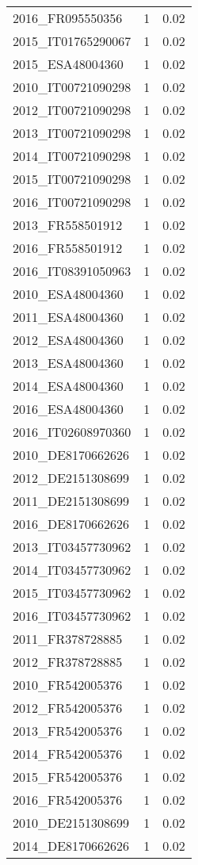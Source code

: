 \begin{table*}[htbp]
\begin{tabular}{lrr}
2016_FR095550356 & 1 & 0.02 \\
2015_IT01765290067 & 1 & 0.02 \\
2015_ESA48004360 & 1 & 0.02 \\
2010_IT00721090298 & 1 & 0.02 \\
2012_IT00721090298 & 1 & 0.02 \\
2013_IT00721090298 & 1 & 0.02 \\
2014_IT00721090298 & 1 & 0.02 \\
2015_IT00721090298 & 1 & 0.02 \\
2016_IT00721090298 & 1 & 0.02 \\
2013_FR558501912 & 1 & 0.02 \\
2016_FR558501912 & 1 & 0.02 \\
2016_IT08391050963 & 1 & 0.02 \\
2010_ESA48004360 & 1 & 0.02 \\
2011_ESA48004360 & 1 & 0.02 \\
2012_ESA48004360 & 1 & 0.02 \\
2013_ESA48004360 & 1 & 0.02 \\
2014_ESA48004360 & 1 & 0.02 \\
2016_ESA48004360 & 1 & 0.02 \\
2016_IT02608970360 & 1 & 0.02 \\
2010_DE8170662626 & 1 & 0.02 \\
2012_DE2151308699 & 1 & 0.02 \\
2011_DE2151308699 & 1 & 0.02 \\
2016_DE8170662626 & 1 & 0.02 \\
2013_IT03457730962 & 1 & 0.02 \\
2014_IT03457730962 & 1 & 0.02 \\
2015_IT03457730962 & 1 & 0.02 \\
2016_IT03457730962 & 1 & 0.02 \\
2011_FR378728885 & 1 & 0.02 \\
2012_FR378728885 & 1 & 0.02 \\
2010_FR542005376 & 1 & 0.02 \\
2012_FR542005376 & 1 & 0.02 \\
2013_FR542005376 & 1 & 0.02 \\
2014_FR542005376 & 1 & 0.02 \\
2015_FR542005376 & 1 & 0.02 \\
2016_FR542005376 & 1 & 0.02 \\
2010_DE2151308699 & 1 & 0.02 \\
2014_DE8170662626 & 1 & 0.02 \\

\end{tabular}
\end{table*}
